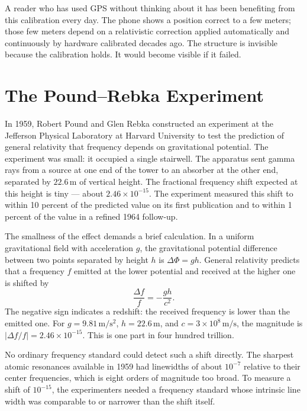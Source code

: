 A reader who has used GPS without thinking about it has been benefiting from
this calibration every day. The phone shows a position correct to a few
meters; those few meters depend on a relativistic correction applied
automatically and continuously by hardware calibrated decades ago. The
structure is invisible because the calibration holds. It would become visible
if it failed.

\section{The Pound--Rebka Experiment}
\label{se:the-pound-rebka-experiment}

In 1959, Robert Pound and Glen Rebka constructed an experiment at the Jefferson
Physical Laboratory at Harvard University to test the prediction of general
relativity that frequency depends on gravitational potential. The experiment
was small: it occupied a single stairwell. The apparatus sent gamma rays from
a source at one end of the tower to an absorber at the other end, separated
by $22{.}6\,\mathrm{m}$ of vertical height. The fractional frequency shift
expected at this height is tiny --- about $2{.}46 \times 10^{-15}$. The
experiment measured this shift to within 10 percent of the predicted value
on its first publication and to within 1 percent of the value in a refined
1964 follow-up.

The smallness of the effect demands a brief calculation. In a uniform
gravitational field with acceleration $g$, the gravitational potential
difference between two points separated by height $h$ is $\Delta\Phi = gh$.
General relativity predicts that a frequency $f$ emitted at the lower
potential and received at the higher one is shifted by
\[
\frac{\Delta f}{f} = -\frac{gh}{c^2}.
\label{eq:chapter8-pound-rebka}
\]
The negative sign indicates a redshift: the received frequency is lower than
the emitted one. For $g = 9{.}81\,\mathrm{m/s^2}$, $h = 22{.}6\,\mathrm{m}$,
and $c = 3 \times 10^8\,\mathrm{m/s}$, the magnitude is $|\Delta f/f| = 2{.}46
\times 10^{-15}$. This is one part in four hundred trillion.

No ordinary frequency standard could detect such a shift directly. The
sharpest atomic resonances available in 1959 had linewidths of about $10^{-7}$
relative to their center frequencies, which is eight orders of magnitude too
broad. To measure a shift of $10^{-15}$, the experimenters needed a frequency
standard whose intrinsic line width was comparable to or narrower than the
shift itself.

